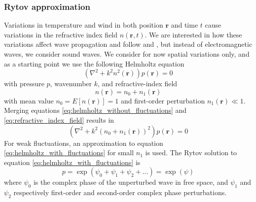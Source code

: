\subsubsection*{Rytov approximation}
Variations in temperature and wind in both position $\mathbf{r}$ and time $t$
cause variations in the refractive index field $n(\mathbf{r},t)$. We are
interested in how these variations affect wave propagation and follow
\cite{Ishimaru1997} and \cite{Jurado-navas2006}, but instead of electromagnetic
waves, we consider sound waves. We consider for now spatial variations only, and
as a starting point we use the following Helmholtz equation
\begin{equation}\label{eq:helmholtz_without_fluctuations}
 \left( \nabla^2 + k^2 n^2(\mathbf{r}) \right) p(\mathbf{r})= 0
\end{equation}
with pressure $p$, wavenumber $k$, and refractive-index field
\begin{equation}\label{eq:refractive_index_field}
 n(\mathbf{r}) = n_0 + n_1(\mathbf{r})
\end{equation}
with mean value $n_0 = E[n(\mathbf{r})] = 1$ and first-order perturbation $n_1(\mathbf{r}) \ll 1$. Merging equations \eqref{eq:helmholtz_without_fluctuations} and \eqref{eq:refractive_index_field} results in
\begin{equation}\label{eq:helmholtz_with_fluctuations}
 \left( \nabla^2 + k^2 (n_0 + n_1(\mathbf{r}))^2 \right) p(\mathbf{r}) = 0
\end{equation}
For weak fluctuations, an approximation to equation \eqref{eq:helmholtz_with_fluctuations} for small $n_1$ is used.
The Rytov solution to equation \eqref{eq:helmholtz_with_fluctuations} is
\begin{equation}
 p = \exp{\left(\psi_0 + \psi_1 + \psi_2 + \dots \right)} = \exp{(\psi)}
\end{equation}
where $\psi_0$ is the complex phase of the unperturbed wave in free space, and $\psi_1$ and $\psi_2$ respectively first-order and second-order complex phase perturbations.

